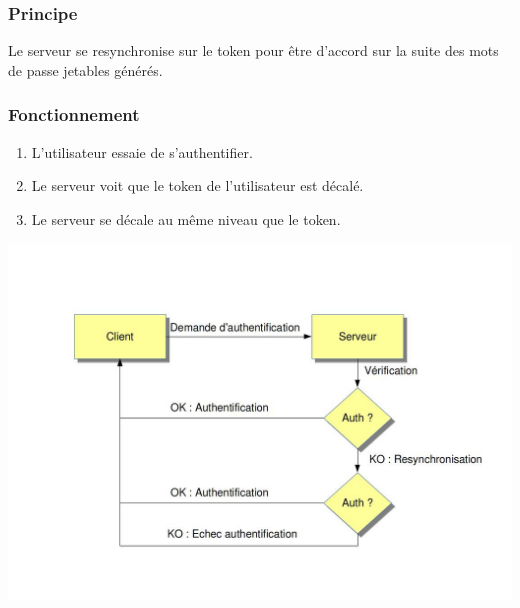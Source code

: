 \documentclass{"../../res/univ-projet"}
\begin{document}
\subsubsection{Principe}
Le serveur se resynchronise sur le token pour être d'accord sur la suite des
mots de passe jetables générés.

\subsubsection{Fonctionnement}
\begin{enumerate}
    \item L'utilisateur essaie de s'authentifier.
    \item Le serveur voit que le token de l'utilisateur est décalé.
    \item Le serveur se décale au même niveau que le token.
\end{enumerate}
\includegraphics[width=\textwidth]{../graphics/resynchronisation.jpg}
\end{document}
